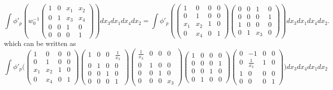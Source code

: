 \documentclass[11pt]{amsart}
\begin{document}
$$%
\int \phi'_p\left(w_0^{-1} \left(\begin{smallmatrix}
		1 & 0 & x_{1} & x_{2} \\
		0 & 1 & x_{3} & x_{4} \\
		0 & 0 & 1 & 0 \\
		0 & 0 & 0 & 1
	\end{smallmatrix}\right)  \right)dx_3 dx_1 dx_4 dx_2 
	= \int \phi'_p \left( \left(\begin{smallmatrix}
		1 & 0 & 0 & 0 \\
		0 & 1 & 0 & 0 \\
		x_{1} & x_{2} & 1 & 0 \\
		0 & x_{4} & 0 & 1
	\end{smallmatrix}\right) \left(\begin{smallmatrix}
		0 & 0 & 1 & 0 \\
		0 & 0 & 0 & 1 \\
		1 & 0 & 0 & 0 \\
		0 & 1 & x_3 & 0
	\end{smallmatrix}\right) \right) dx_3 dx_1 dx_4 dx_2.
$$
which can be written as
$$	
\int \phi'_p \biggl( \left(\begin{smallmatrix}
		1 & 0 & 0 & 0 \\
		0 & 1 & 0 & 0 \\
		x_{1} & x_{2} & 1 & 0 \\
		0 & x_{4} & 0 & 1
	\end{smallmatrix}\right) 
	\left(\begin{smallmatrix}
		1 & 0 & 0 & \frac{1}{x_{3}} \\
		0 & 1 & 0 & 0 \\
		0 & 0 & 1 & 0 \\
		0 & 0 & 0 & 1
	\end{smallmatrix}\right) 
	\left(\begin{smallmatrix}
		\frac{1}{x_{3}} & 0 & 0 & 0 \\
		0 & 1 & 0 & 0 \\
		0 & 0 & 1 & 0 \\
		0 & 0 & 0 & x_{3}
	\end{smallmatrix}\right)
	\left(\begin{smallmatrix}
		1 & 0 & 0 & 0 \\
		0 & 0 & 0 & 1 \\
		0 & 0 & 1 & 0 \\
		0 & 1 & 0 & 0
	\end{smallmatrix}\right)
	\left(\begin{smallmatrix}
		0 & -1 & 0 & 0 \\
		0 & \frac{1}{x_{3}} & 1 & 0 \\
		1 & 0 & 0 & 0 \\
		0 & 0 & 0 & 1
	\end{smallmatrix}\right)
	\biggr) dx_3 dx_4 dx_1 dx_2
$$%
\end{document}
